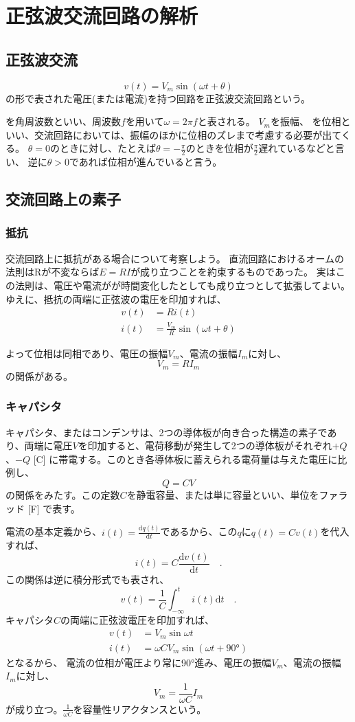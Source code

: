 \documentclass{ltjsreport}
\newcommand{\diff}{\mathrm{d}}
\newcommand{\dft}[1]{\frac{\mathrm{d}#1}{\mathrm{d}t}}
\begin{document}
\section{正弦波交流回路の解析}

\subsection{正弦波交流}
\[
  v(t) = V_m \sin(\omega t + \theta)
\]
の形で表された電圧(または電流)を持つ回路を正弦波交流回路という。

\omega を角周波数といい、周波数$f$を用いて$\omega = 2 \pi f$と表される。
$V_m$を振幅、
\theta を位相といい、交流回路においては、振幅のほかに位相のズレまで考慮する必要が出てくる。
$\theta = 0$のときに対し、たとえば$\theta = -\frac{\pi}{2}$のときを位相が$\frac{\pi}{2}$遅れているなどと言い、
逆に$\theta >0 $であれば位相が進んでいると言う。

\subsection{交流回路上の素子}

\subsubsection{抵抗}
交流回路上に抵抗がある場合について考察しよう。
直流回路におけるオームの法則はRが不変ならば$E=RI$が成り立つことを約束するものであった。
実はこの法則は、電圧や電流がが時間変化したとしても成り立つとして拡張してよい。
ゆえに、抵抗の両端に正弦波の電圧を印加すれば、
\begin{align}
  v(t) &= Ri(t)\\
  i(t) &= \frac{V_m}{R} \sin(\omega t + \theta)
\end{align}

よって位相は同相であり、電圧の振幅$V_m$、電流の振幅$I_m$に対し、
\[
  V_m = R I_m
\]
の関係がある。

\subsubsection{キャパシタ}
キャパシタ、またはコンデンサは、2つの導体板が向き合った構造の素子であり、両端に電圧$V$を印加すると、電荷移動が発生して2つの導体板がそれぞれ$+Q$、$-Q$ [C] に帯電する。このとき各導体板に蓄えられる電荷量は与えた電圧に比例し、
\[
  Q = CV
  \]
の関係をみたす。この定数$C$を静電容量、または単に容量といい、単位をファラッド [F] で表す。

電流の基本定義から、$i(t) = \dft{q(t)}$であるから、この$q$に$q(t)=Cv(t)$を代入すれば、
\[
  i(t) = C \dft{v(t)} \quad .
\]
この関係は逆に積分形式でも表され、
\[
  v(t) = \frac{1}{C}\int_{-\infty}^{t} i(t) \diff t \quad .
\]
キャパシタ$C$の両端に正弦波電圧を印加すれば、
\begin{align}
  v(t) &= V_m \sin \omega t\\
  i(t) &= \omega CV_m \sin (\omega t + \ang{90})
\end{align}
となるから、
電流の位相が電圧より常に\ang{90}進み、電圧の振幅$V_m$、電流の振幅$I_m$に対し、
\[
  V_m = \frac{1}{\omega C} I_m
\]
が成り立つ。$\frac{1}{\omega C}$を容量性リアクタンスという。
\end{document}
